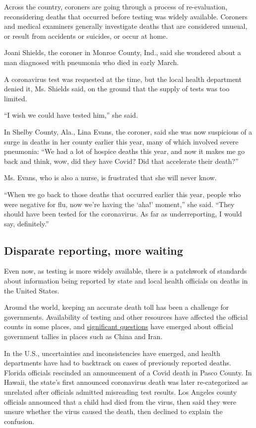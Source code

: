 Across the country, coroners are going through a process of
re-evaluation, reconsidering deaths that occurred before testing was
widely available. Coroners and medical examiners generally investigate
deaths that are considered unusual, or result from accidents or
suicides, or occur at home.

Joani Shields, the coroner in Monroe County, Ind., said she wondered
about a man diagnosed with pneumonia who died in early March.

A coronavirus test was requested at the time, but the local health
department denied it, Ms. Shields said, on the ground that the supply of
tests was too limited.

``I wish we could have tested him,'' she said.

In Shelby County, Ala., Lina Evans, the coroner, said she was now
suspicious of a surge in deaths in her county earlier this year, many of
which involved severe pneumonia: ``We had a lot of hospice deaths this
year, and now it makes me go back and think, wow, did they have Covid?
Did that accelerate their death?''

Ms. Evans, who is also a nurse, is frustrated that she will never know.

``When we go back to those deaths that occurred earlier this year,
people who were negative for flu, now we're having the `aha!' moment,''
she said. ``They should have been tested for the coronavirus. As far as
underreporting, I would say, definitely.''

\hypertarget{disparate-reporting-more-waiting}{%
\subsection{Disparate reporting, more
waiting}\label{disparate-reporting-more-waiting}}

Even now, as testing is more widely available, there is a patchwork of
standards about information being reported by state and local health
officials on deaths in the United States.

Around the world, keeping an accurate death toll has been a challenge
for governments. Availability of testing and other resources have
affected the official counts in some places, and
\href{https://www.nytimes3xbfgragh.onion/2020/04/02/us/politics/cia-coronavirus-china.html}{significant
questions} have emerged about official government tallies in places such
as China and Iran.

In the U.S., uncertainties and inconsistencies have emerged, and health
departments have had to backtrack on cases of previously reported
deaths. Florida officials rescinded an announcement of a Covid death in
Pasco County. In Hawaii, the state's first announced coronavirus death
was later re-categorized as unrelated after officials admitted
misreading test results. Los Angeles county officials announced that a
child had died from the virus, then said they were unsure whether the
virus caused the death, then declined to explain the confusion.

